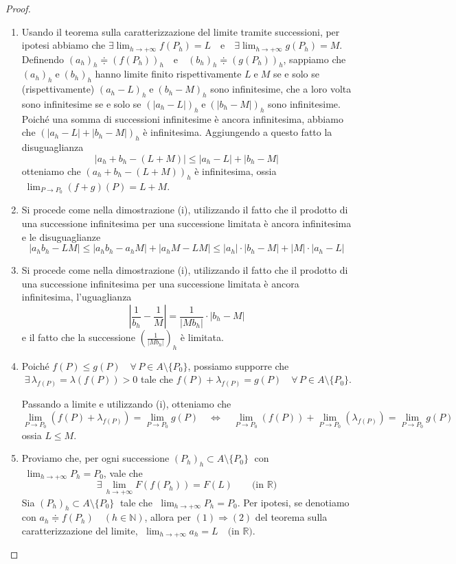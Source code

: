 \begin{proof}
\begin{enumerate}[labelindent=\parindent,leftmargin=*,label=\textnormal{(\roman*)},start=1]
\item Usando il teorema sulla caratterizzazione del limite tramite successioni, per ipotesi abbiamo che $\displaystyle \exists \lim_{h \longrightarrow +\infty} f(P_h) = L \quad \text{e} \quad \exists \lim_{h \longrightarrow +\infty} g(P_h) = M$. Definendo $(a_h)_h \doteqdot (f(P_h))_h \quad \text{e} \quad (b_h)_h \doteqdot (g(P_h))_h$, sappiamo che $(a_h)_h \; \text{e} \; (b_h)_h$ hanno limite finito rispettivamente $L \; \text{e} \; M$ se e solo se (rispettivamente) $(a_h - L)_h \; \text{e} \; (b_h - M)_h$ sono infinitesime, che a loro volta sono infinitesime se e solo se $(|a_h - L|)_h \; \text{e} \; (|b_h - M|)_h$ sono infinitesime. Poiché una somma di successioni infinitesime è ancora infinitesima, abbiamo che $(|a_h - L| + |b_h - M|)_h$ è infinitesima. Aggiungendo a questo fatto la disuguaglianza
$$|a_h + b_h - (L + M)| \leq |a_h - L| + |b_h - M|$$
otteniamo che $(a_h + b_h - (L + M))_h$ è infinitesima, ossia $\; \displaystyle \lim_{P \rightarrow P_0} (f + g)(P) = L + M$.
\item Si procede come nella dimostrazione (i), utilizzando il fatto che il prodotto di una successione infinitesima per una successione limitata è ancora infinitesima e le disuguaglianze
$$|a_h b_h - LM| \leq |a_hb_h - a_hM| + |a_hM - LM| \leq |a_h| \cdot |b_h - M| + |M| \cdot |a_h - L|$$
\item Si procede come nella dimostrazione (i), utilizzando il fatto che il prodotto di una successione infinitesima per una successione limitata è ancora infinitesima, l'uguaglianza
$$|\frac{1}{b_h} - \frac{1}{M}| = \frac{1}{|Mb_h|} \cdot |b_h - M|$$
e il fatto che la successione $\left( \frac{1}{|Mb_h|} \right)_h$ è limitata.
\item Poiché $f(P) \leq g(P) \quad \forall \, P \in A \setminus \lbrace P_0 \rbrace$, possiamo supporre che $\; \exists \, \lambda_{f(P)} = \lambda (f(P)) > 0$ tale che $f(P) + \lambda_{f(P)} = g(P) \quad \forall \, P \in A \setminus \lbrace P_0 \rbrace$.

Passando a limite e utilizzando (i), otteniamo che
$$ \lim_{P \rightarrow P_0} (f(P) + \lambda_{f(P)}) = \lim_{P \rightarrow P_0} g(P) \quad \Longleftrightarrow \quad \lim_{P \rightarrow P_0} (f(P)) + \lim_{P \rightarrow P_0} (\lambda_{f(P)}) = \lim_{P \rightarrow P_0} g(P)$$
ossia $L \leq M$.
\item Proviamo che, per ogni successione $(P_h)_h \subset A \setminus \lbrace P_0 \rbrace \;$ con $\; \displaystyle \lim_{h \rightarrow +\infty} P_h = P_0$, vale che
$$\exists \, \lim_{h \rightarrow +\infty} F(f(P_h)) = F(L) \qquad \text{(in } \mathbb{R} \text{)}$$
Sia $(P_h)_h \subset A \setminus \lbrace P_0 \rbrace \;$ tale che $\; \displaystyle \lim_{h \rightarrow +\infty} P_h = P_0$. Per ipotesi, se denotiamo con $a_h \doteqdot f(P_h) \quad (h \in \mathbb{N})$, allora per $(1) \Longrightarrow (2)$ del teorema sulla caratterizzazione del limite, $\; \displaystyle \lim_{h \rightarrow +\infty} a_h = L \quad \text{(in } \mathbb{R} \text{)}$.


\end{enumerate}
\end{proof}
